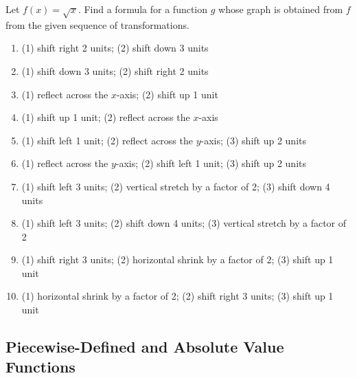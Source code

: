 \documentclass[12pt]{book}
\theoremstyle{definition}
\begin{document}
Let $f(x) = \sqrt{x}$.  Find a formula for a function $g$ whose graph is obtained from $f$ from the given sequence of transformations. 
\begin{enumerate}[resume]
\item  (1) shift right 2 units; (2) shift down 3 units
\item  (1) shift down 3 units; (2) shift right 2 units
\item  (1) reflect across the $x$-axis; (2) shift up 1 unit
\item  (1) shift up 1 unit; (2) reflect across the $x$-axis
\item  (1) shift left 1 unit; (2) reflect across the $y$-axis; (3) shift up 2 units
\item  (1) reflect across the $y$-axis;  (2) shift left 1 unit;  (3) shift up 2 units
\item  (1) shift left 3 units; (2) vertical stretch by a factor of 2; (3) shift down 4 units
\item  (1) shift left 3 units; (2) shift down 4 units; (3) vertical stretch by a factor of 2
\item  (1) shift right 3 units; (2) horizontal shrink by a factor of 2; (3) shift up 1 unit
\item  (1) horizontal shrink by a factor of 2; (2) shift right 3 units; (3) shift up 1 unit
\end{enumerate}
\newpage
\subsection*{Piecewise-Defined and Absolute Value Functions}
\end{document}
